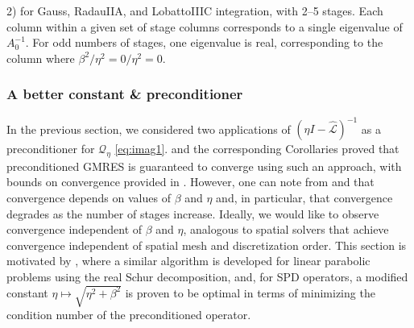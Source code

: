 \documentclass[review]{siamart}
\begin{document}
{\begin{table}[!ht]
{  2) for Gauss, RadauIIA, and LobattoIIIC integration,
  with 2--5 stages. Each column within a given set of stage columns corresponds to a
  single eigenvalue of $A_0^{-1}$. For odd numbers of stages, one eigenvalue is real,
  corresponding to the column where $\beta^2/\eta^2 = 0/\eta^2 = 0$.}\label{tab:beta}
\end{table}
}

\clearpage
\subsubsection{A better constant \& preconditioner}

In the previous section, we considered two applications of $(\eta I -
\widehat{\mathcal{L}})^{-1}$ as a preconditioner for $\mathcal{Q}_\eta$ \eqref{eq:imag1}.
 and the corresponding Corollaries proved that preconditioned
GMRES is guaranteed to converge using such an approach, with bounds on convergence
provided in . However, one can note from  and
 that convergence depends on values of $\beta$ and $\eta$ and, in
particular, that convergence degrades as the number of stages increase. Ideally,
we would like to observe convergence independent of $\beta$ and $\eta$, analogous
to spatial solvers that achieve convergence independent of spatial mesh and
discretization order. This section is motivated by \cite{exh}, where a similar
algorithm is developed for linear parabolic problems using the real Schur
decomposition, and, for SPD operators, a modified constant $\eta \mapsto
\sqrt{\eta^2+\beta^2}$ is proven to be optimal in terms of minimizing the
condition number of the preconditioned operator.
\end{document}
